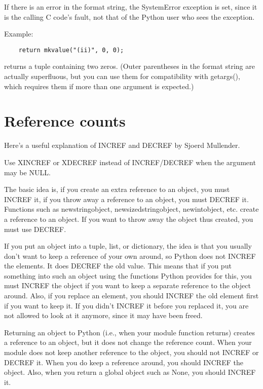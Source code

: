 If there is an error in the format string, the SystemError exception
is set, since it is the calling C code's fault, not that of the Python
user who sees the exception.

Example:

\begin{verbatim}
    return mkvalue("(ii)", 0, 0);
\end{verbatim}

returns a tuple containing two zeros.  (Outer parentheses in the
format string are actually superfluous, but you can use them for
compatibility with getargs(), which requires them if more than one
argument is expected.)

\section{Reference counts}

Here's a useful explanation of INCREF and DECREF by Sjoerd Mullender.

Use XINCREF or XDECREF instead of INCREF/DECREF when the argument may
be NULL.

The basic idea is, if you create an extra reference to an object, you
must INCREF it, if you throw away a reference to an object, you must
DECREF it.  Functions such as newstringobject, newsizedstringobject,
newintobject, etc. create a reference to an object.  If you want to
throw away the object thus created, you must use DECREF.

If you put an object into a tuple, list, or dictionary, the idea is
that you usually don't want to keep a reference of your own around, so
Python does not INCREF the elements.  It does DECREF the old value.
This means that if you put something into such an object using the
functions Python provides for this, you must INCREF the object if you
want to keep a separate reference to the object around.  Also, if you
replace an element, you should INCREF the old element first if you
want to keep it.  If you didn't INCREF it before you replaced it, you
are not allowed to look at it anymore, since it may have been freed.

Returning an object to Python (i.e., when your module function
returns) creates a reference to an object, but it does not change the
reference count.  When your module does not keep another reference to
the object, you should not INCREF or DECREF it.  When you do keep a
reference around, you should INCREF the object.  Also, when you return
a global object such as None, you should INCREF it.

